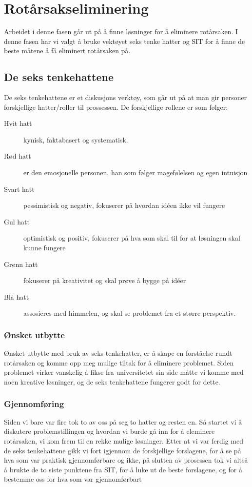 \chapter{Rotårsakseliminering}
Arbeidet i denne fasen går ut på å finne løsninger for å eliminere rotårsaken. I denne fasen har vi valgt å bruke vektøyet seks tenke hatter og SIT for å finne de beste måtene å få eliminert rotårsaken på. 

\section{De seks tenkehattene}
De seks tenkehattene er et diskusjons verktøy, som går ut på at man gir personer forskjellige hatter/roller til prossessen. De forskjellige rollene er som følger:
\begin{description}
    \item [Hvit hatt] kynisk, faktabasert og systematisk.
    \item [Rød hatt] er den emosjonelle personen, han som følger magefølelsen og egen intuisjon
    \item[Svart hatt] pessimistisk og negativ, fokuserer på hvordan idéen ikke vil
    fungere
    \item [Gul hatt] optimistisk og positiv, fokuserer på hva som skal til for at løsningen skal kunne fungere
    \item[Grønn hatt] fokuserer på kreativitet og skal prøve å bygge på idéer
    \item[Blå hatt] assosieres med himmelen, og skal se problemet fra et større perspektiv.
\end{description}

\subsection{Ønsket utbytte}
Ønsket utbytte med bruk av seks tenkehatter, er å skape en forståelse rundt rotårsaken og komme opp meg mulige tiltak for å eliminere problemet. Siden problemet virker vanskelig å fikse fra universitetet sin side måtte vi komme med noen kreative løsninger, og de seks tenkehattene fungerer godt for dette.

\subsection{Gjennomføring}
Siden vi bare var fire tok to av oss på seg to hatter og resten en. Så startet vi å diskutere problemstillingen og hvordan vi burde gå inn for å eleminere rotårsaken, vi kom frem til en rekke mulige løsninger. Etter at vi var ferdig med de seks tenkehattene gikk vi fort igjennom de forskjellige forslagene, for å se på hva som var praktisk gjennomførbare og ikke, på slutten av prosessen tok vi altså å brukte de to siste punktene fra SIT, for å luke ut de beste forslagene, og for å bestemme oss for hva som var gjennomførbart

